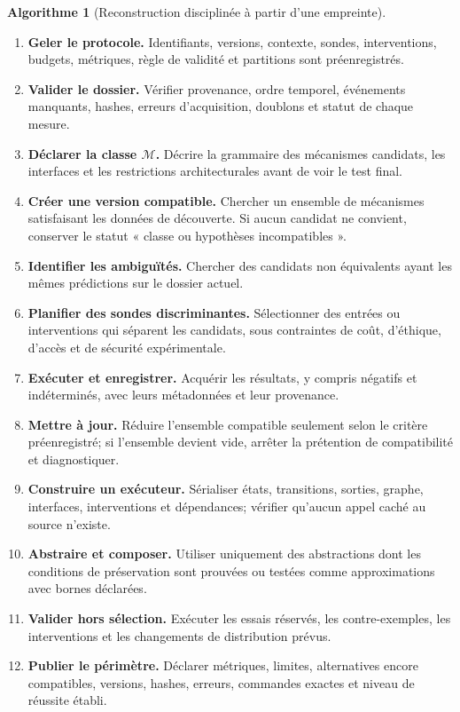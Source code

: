 \documentclass[11pt,oneside]{book}
\theoremstyle{definition}
\newtheorem{algorithme}[theoreme]{Algorithme}
\theoremstyle{remark}
\newcommand{\Mcal}{\mathcal M}
\newcommand{\1}{\mathbf 1}
\begin{document}
\begin{algorithme}[Reconstruction disciplinée à partir d'une empreinte]
\begin{enumerate}
\item \textbf{Geler le protocole.} Identifiants, versions, contexte, sondes, interventions, budgets, métriques, règle de validité et partitions sont préenregistrés.
\item \textbf{Valider le dossier.} Vérifier provenance, ordre temporel, événements manquants, hashes, erreurs d'acquisition, doublons et statut de chaque mesure.
\item \textbf{Déclarer la classe $\Mcal$.} Décrire la grammaire des mécanismes candidats, les interfaces et les restrictions architecturales avant de voir le test final.
\item \textbf{Créer une version compatible.} Chercher un ensemble de mécanismes satisfaisant les données de découverte. Si aucun candidat ne convient, conserver le statut « classe ou hypothèses incompatibles ».
\item \textbf{Identifier les ambiguïtés.} Chercher des candidats non équivalents ayant les mêmes prédictions sur le dossier actuel.
\item \textbf{Planifier des sondes discriminantes.} Sélectionner des entrées ou interventions qui séparent les candidats, sous contraintes de coût, d'éthique, d'accès et de sécurité expérimentale.
\item \textbf{Exécuter et enregistrer.} Acquérir les résultats, y compris négatifs et indéterminés, avec leurs métadonnées et leur provenance.
\item \textbf{Mettre à jour.} Réduire l'ensemble compatible seulement selon le critère préenregistré; si l'ensemble devient vide, arrêter la prétention de compatibilité et diagnostiquer.
\item \textbf{Construire un exécuteur.} Sérialiser états, transitions, sorties, graphe, interfaces, interventions et dépendances; vérifier qu'aucun appel caché au source n'existe.
\item \textbf{Abstraire et composer.} Utiliser uniquement des abstractions dont les conditions de préservation sont prouvées ou testées comme approximations avec bornes déclarées.
\item \textbf{Valider hors sélection.} Exécuter les essais réservés, les contre-exemples, les interventions et les changements de distribution prévus.
\item \textbf{Publier le périmètre.} Déclarer métriques, limites, alternatives encore compatibles, versions, hashes, erreurs, commandes exactes et niveau de réussite établi.
\end{enumerate}
\end{algorithme}
\end{document}
